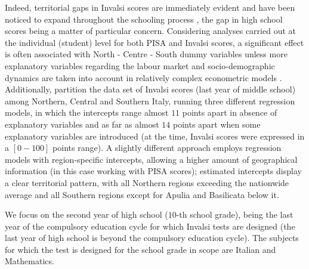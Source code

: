 \documentclass{book}
\begin{document}

Indeed, territorial gaps in Invalsi scores are immediately evident and have been noticed to expand throughout the schooling process \citep{Invalsi2020}, the gap in high school scores being a matter of particular concern.  Considering analyses carried out at the individual (student) level for both PISA and Invalsi scores, a significant effect is often associated with North - Centre - South dummy variables  \citep[as in e.g. ][]{Giancola, Bratti, Agasisti, UniromaWP1} unless more explanatory variables regarding the labour market and socio-demographic dynamics are taken into account in relatively complex econometric models \citep{Bratti}. Additionally, \cite{Agasisti} partition the data set of Invalsi scores (last year of middle school) among Northern, Central and Southern Italy, running three different regression models, in which the intercepts range almost $11$ points apart in absence of explanatory variables and as far as almost $14$ points apart when some explanatory variables are introduced (at the time, Invalsi scores were expressed in a $[0-100]$ points range). A slightly different approach employs regression models with region-specific intercepts, allowing a higher amount of geographical information \citep{Matteucci} (in this case working with PISA scores); estimated intercepts display a clear territorial pattern, with all Northern regions exceeding the nationwide average and all Southern regions except for Apulia and Basilicata below it.

We focus on the second year of high school ($10$-th school grade), being the last year of the compulsory education cycle for which Invalsi tests are designed (the last year of high school is beyond the compulsory education cycle). The subjects for which the test is designed for the school grade in scope are Italian and Mathematics.
\end{document}
